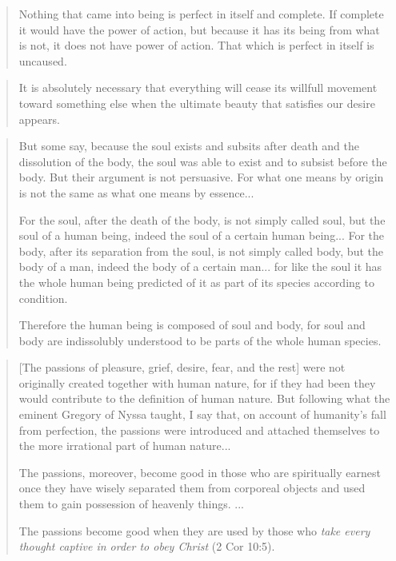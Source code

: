 \begin{quote}
	Nothing that came into being is perfect in itself and complete. If complete it would have the power of action, but because it has its being from what is not, it does not have power of action. That which is perfect in itself is uncaused.
\end{quote}

\begin{quote}
	It is absolutely necessary that everything will cease its willfull movement toward something else when the ultimate beauty that satisfies our desire appears.
\end{quote}

\begin{quote}
	But some say, because the soul exists and subsits after death and the dissolution of the body, the soul was able to exist and to subsist before the body. But their argument is not persuasive. For what one means by origin is not the same as what one means by essence...

	For the soul, after the death of the body, is not simply called soul, but the soul of a human being, indeed the soul of a certain human being... For the body, after its separation from the soul, is not simply called body, but the body of a man, indeed the body of a certain man... for like the soul it has the whole human being predicted of it as part of its species according to condition.

	Therefore the human being is composed of soul and body, for soul and body are indissolubly understood to be parts of the whole human species.
\end{quote}

\begin{quote}
	[The passions of pleasure, grief, desire, fear, and the rest] were not originally created together with human nature, for if they had been they would contribute to the definition of human nature. But following what the eminent Gregory of Nyssa taught, I say that, on account of humanity's fall from perfection, the passions were introduced and attached themselves to the more irrational part of human nature...

	The passions, moreover, become good in those who are spiritually earnest once they have wisely separated them from corporeal objects and used them to gain possession of heavenly things. ...

	The passions become good when they are used by those who \textit{take every thought captive in order to obey Christ} (2 Cor 10:5).
\end{quote}

